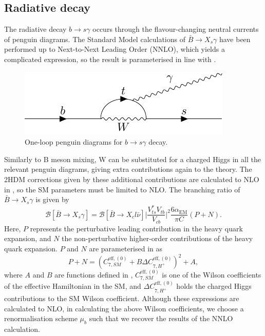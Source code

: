 \documentclass[a4paper,12pt]{article}
\begin{document}
\subsection{Radiative decay}
\label{subsec:rad}
The radiative decay $b\to s\gamma$ occurs through the flavour-changing neutral currents of penguin diagrams.
The Standard Model calculations of $\bar{B}\to X_s\gamma$ have been performed up to Next-to-Next Leading Order (NNLO), which yields a complicated expression, so the result is parameterised in line with \cite{desc,susy}.
\begin{figure}[H]
    \centering
    \includegraphics[width=\textwidth]{bsgam.pdf}
    \caption{\label{fig:bsgam} One-loop penguin diagrams for $b\to s\gamma$ decay.}
\end{figure}
Similarly to B meson mixing, W can be substituted for a charged Higgs in all the relevant penguin diagrams, giving extra contributions again to the theory. 
The 2HDM corrections given by these additional contributions are calculated to NLO in \cite{susy}, so the SM parameters must be limited to NLO.
The branching ratio of $\bar{B}\to X_s\gamma$ is given by
\begin{equation}
    \label{eq:xsgam}
    \mathcal{B}[\bar{B}\to X_s\gamma] = \mathcal{B}[\bar{B}\to X_cl\bar{\nu}] \bigg|\frac{V_{ts}^*V_{tb}}{V_{cb}}\bigg|^2 \frac{6\alpha_{\text{EM}}}{\pi C}(P+N).
\end{equation}
Here, $P$ represents the perturbative leading contribution in the heavy quark expansion, and $N$ the non-perturbative higher-order contributions of the heavy quark expansion.
$P$ and $N$ are parameterised in \cite{desc,susy} as 
\begin{equation}
    \label{eq:pplsn}
    P+N = (C^{\text{eff},(0)}_{7,SM}+B\Delta C_{7,H^+}^{\text{eff},(0)})^2+A,
\end{equation}
where $A$ and $B$ are functions defined in \cite{desc}, $C_{7,SM}^{\text{eff},(0)}$ is one of the Wilson coefficients of the effective Hamiltonian in the SM, and $\Delta C_{7,H^+}^{\text{eff},(0)}$ holds the charged Higgs contributions to the SM Wilson coefficient. 
Although these expressions are calculated to NLO, in calculating the above Wilson coefficients, we choose a renormalisation scheme $\mu_b$ such that we recover the results of the NNLO calculation. 
\end{document}
